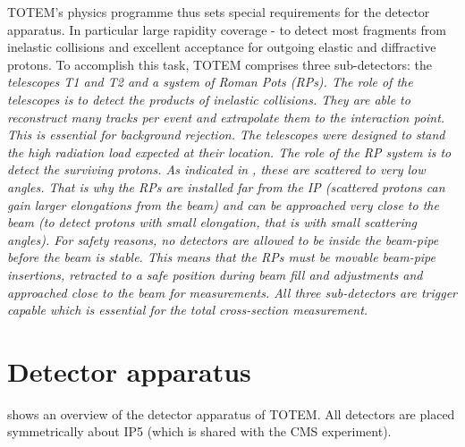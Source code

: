 

TOTEM's physics programme thus sets special requirements for the detector apparatus. In particular large rapidity coverage - to detect most fragments from inelastic collisions and excellent acceptance for outgoing elastic and diffractive protons. To accomplish this task, TOTEM comprises three sub-detectors: the \em{telescopes T1 and T2} and a system of \em{Roman Pots} (RPs). The role of the telescopes is to detect the products of inelastic collisions. They are able to reconstruct many tracks per event and extrapolate them to the interaction point. This is essential for background rejection. The telescopes were designed to stand the high radiation load expected at their location. The role of the RP system is to detect the surviving protons. As indicated in , these are scattered to very low angles. That is why the RPs are installed far from the IP (scattered protons can gain larger elongations from the beam) and can be approached very close to the beam (to detect protons with small elongation, that is with small scattering angles). For safety reasons, no detectors are allowed to be inside the beam-pipe before the beam is stable. This means that the RPs must be movable beam-pipe insertions, retracted to a safe position during beam fill and adjustments and approached close to the beam for measurements. All three sub-detectors are trigger capable which is essential for the total cross-section measurement.






\section[ttm det]{Detector apparatus}

 shows an overview of the detector apparatus of TOTEM. All detectors are placed symmetrically about IP5 (which is shared with the CMS experiment). 

